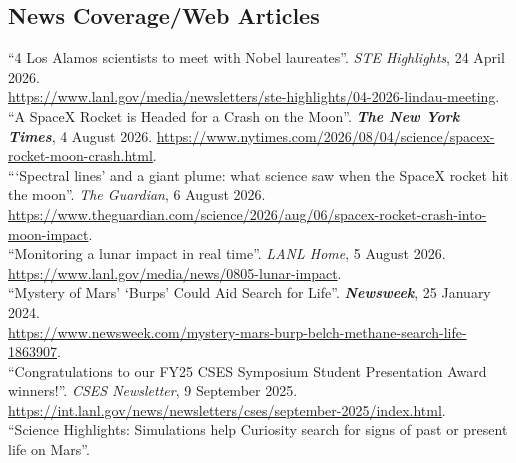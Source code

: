 \documentclass[11pt, letterpaper]{article}
\newcommand{\years}[1]{\marginnote{\scriptsize #1}}
\begin{document}
\subsection*{News Coverage/Web Articles}
\label{sec:news}
\noindent
\years{\textbf{2026}}``4 Los Alamos scientists to meet with Nobel laureates''.
\emph{STE Highlights}, 24 April 2026.\\ 
\href{https://www.lanl.gov/media/newsletters/ste-highlights/04-2026-lindau-meeting}
{https://www.lanl.gov/media/newsletters/ste-highlights/04-2026-lindau-meeting}.\\
%
\years{\textbf{2026}}``A SpaceX Rocket is Headed for a Crash on the Moon''.
\emph{\textbf{The New York Times}}, 4 August 2026. 
\href{https://www.nytimes.com/2026/08/04/science/spacex-rocket-moon-crash.html}
{https://www.nytimes.com/2026/08/04/science/spacex-rocket-moon-crash.html}.\\
% 
\years{2026}``‘Spectral lines’ and a giant plume: what science saw when the SpaceX rocket hit the moon''.
\emph{The Guardian}, 6 August 2026. 
\href{https://www.theguardian.com/science/2026/aug/06/spacex-rocket-crash-into-moon-impact}
{https://www.theguardian.com/science/2026/aug/06/spacex-rocket-crash-into-moon-impact}.\\
% 
\years{2026}``Monitoring a lunar impact in real time''.
\emph{LANL Home}, 5 August 2026.\\ 
\href{https://www.lanl.gov/media/news/0805-lunar-impact}
{https://www.lanl.gov/media/news/0805-lunar-impact}.\\
% 
\years{\textbf{2024}}``Mystery of Mars' `Burps' Could Aid Search for Life''.
\emph{\textbf{Newsweek}}, 25 January 2024.\\
\href{https://www.newsweek.com/mystery-mars-burp-belch-methane-search-life-1863907}
{https://www.newsweek.com/mystery-mars-burp-belch-methane-search-life-1863907}.\\
% 
\years{2025}``Congratulations to our FY25 CSES Symposium Student Presentation
Award winners!''. \emph{CSES Newsletter}, 9 September 2025.
\href{https://int.lanl.gov/news/newsletters/cses/september-2025/index.html}{https://int.lanl.gov/news/newsletters/cses/september-2025/index.html}.\\
%
\years{2024}``Science Highlights: Simulations help Curiosity search for signs of past or present life on Mars''. 
\end{document}
